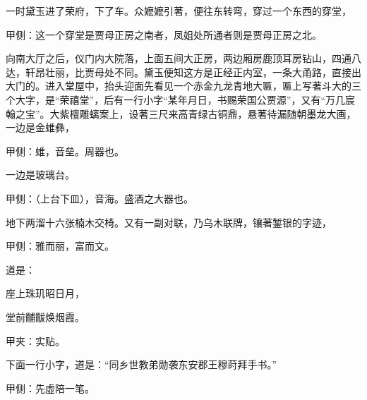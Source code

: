 \begin{parag}
    一时黛玉进了荣府，下了车。众嬷嬷引著，便往东转弯，穿过一个东西的穿堂，\begin{note}甲侧：这一个穿堂是贾母正房之南者，凤姐处所通者则是贾母正房之北。\end{note}向南大厅之后，仪门内大院落，上面五间大正房，两边厢房鹿顶耳房钻山，四通八达，轩昂壮丽，比贾母处不同。黛玉便知这方是正经正内室，一条大甬路，直接出大门的。进入堂屋中，抬头迎面先看见一个赤金九龙青地大匾，匾上写著斗大的三个大字，是“荣禧堂”，后有一行小字“某年月日，书赐荣国公贾源”，又有“万几宸翰之宝”。大紫檀雕螭案上，设著三尺来高青绿古铜鼎，悬著待漏随朝墨龙大画，一边是金蜼彝，\begin{note}甲侧：蜼，音垒。周器也。\end{note}一边是玻璃台。\begin{note}甲侧：（上台下皿），音海。盛酒之大器也。\end{note}地下两溜十六张楠木交椅。又有一副对联，乃乌木联牌，镶著錾银的字迹，\begin{note}甲侧：雅而丽，富而文。\end{note}道是：
\end{parag}


\begin{poem}
    \begin{pl} 座上珠玑昭日月，\end{pl}

    \begin{pl}堂前黼黻焕烟霞。\end{pl}\begin{note}甲夹：实贴。\end{note}
\end{poem}


\begin{parag}
    下面一行小字，道是：“同乡世教弟勋袭东安郡王穆莳拜手书。”\begin{note}甲侧：先虚陪一笔。\end{note}
\end{parag}



